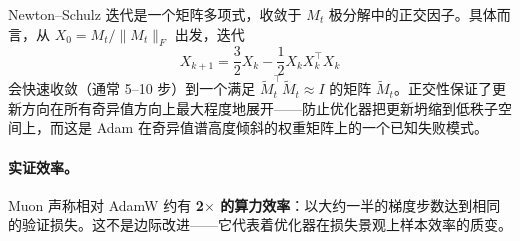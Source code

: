 Newton--Schulz 迭代是一个矩阵多项式，收敛于 $M_t$ 极分解中的正交因子。具体而言，从 $X_0 = M_t / \|M_t\|_F$ 出发，迭代
\[
X_{k+1} = \frac{3}{2} X_k - \frac{1}{2} X_k X_k^\top X_k
\]
会快速收敛（通常 5--10 步）到一个满足 $\tilde{M}_t^\top \tilde{M}_t \approx I$ 的矩阵 $\tilde{M}_t$。正交性保证了更新方向在所有奇异值方向上最大程度地展开——防止优化器把更新坍缩到低秩子空间上，而这是 Adam 在奇异值谱高度倾斜的权重矩阵上的一个已知失败模式。

\paragraph{实证效率。}
Muon 声称相对 AdamW 约有 \textbf{2$\times$ 的算力效率}：以大约一半的梯度步数达到相同的验证损失。这不是边际改进——它代表着优化器在损失景观上样本效率的质变。

